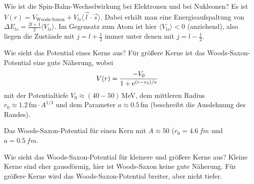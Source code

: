 \begin{fquestion}{Wie ist die Spin-Bahn-Wechselwirkung bei Elektronen und bei Nukleonen?}
    Es ist $V(r) = V_\text{Woods-Saxon} + V_{l s}\langle \Vec{l} \cdot\Vec{s}\rangle $.
    Dabei erhält man eine Energieaufspaltung von $\Delta E_{ls} = \frac{2l+1}{2} \langle V_{ls} \rangle$.
    Im Gegensatz zum Atom ist hier $\langle V_{ls} \rangle < 0$ (anziehend), also liegen die Zustände mit $j = l + \frac{1}{2}$ immer unter denen mit $j = l - \frac{1}{2}$.
\end{fquestion}

\begin{fquestion}{Wie sieht das Potential eines Kerns aus?}
    Für größere Kerne ist das Woods-Saxon-Potential eine gute Näherung, wobei
    $$V(r) = \frac{-V_0}{1 + \text{e}^{(r-r_0) / a}}$$
    mit der Potentialtiefe $V_0 \approx (40-50)\,$MeV, dem mittleren Radius $r_0 \approx 1.2\,\mathrm{fm}\cdot A^{1/3}$ und dem Parameter $a\approx 0.5\,$fm (beschreibt die Ausdehnung des Randes). 
    
    
    Das Woods-Saxon-Potential für einen Kern mit $A \approx 50$ ($r_0 = \SI{4.6}{fm}$ und $a = \SI{0.5}{fm}$.
    \begin{center}
    \end{center}
\end{fquestion}


\begin{fquestion}{Wie sieht das Woods-Saxon-Potential für kleinere und größere Kerne aus?}
    Kleine Kerne sind eher gaussförmig, hier ist Woods-Saxon keine gute Näherung. 
    Für größere Kerne wird das Woods-Saxon-Potential breiter, aber nicht tiefer. 
\end{fquestion}


